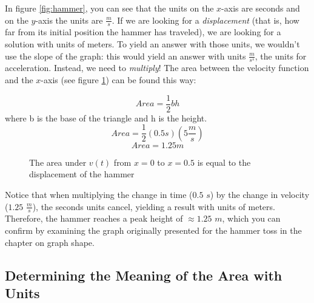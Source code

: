 In figure \ref{fig:hammer}, you can see that the units on the $x$-axis are seconds and on the $y$-axis the units are $\frac{m}{s}$. If we are looking for a \textit{displacement} (that is, how far from its initial position the hammer has traveled), we are looking for a solution with units of meters. To yield an answer with those units, we wouldn't use the slope of the graph: this would yield an answer with units $\frac{m}{s^s}$, the units for acceleration. Instead, we need to \textit{multiply}! The area between the velocity function and the $x$-axis (see figure \ref{fig:hammerarea}) can be found this way:

$$Area=\frac{1}{2}bh$$where b is the base of the triangle and h is the height. 
$$Area=\frac{1}{2}(0.5s)(5\frac{m}{s})$$
$$Area=1.25m$$


\begin{figure}[htbp]
	\centering
	\caption{The area under $v(t)$ from $x=0$ to $x=0.5$ is equal to the displacement of the hammer}
	\label{fig:hammerarea}
\end{figure}

Notice that when multiplying the change in time ($0.5$ $s$) by the change in velocity ($1.25$ $\frac{m}{s}$), the seconds units cancel, yielding a result with units of meters. Therefore, the hammer reaches a peak height of $\approx1.25$ $m$, which you can confirm by examining the graph originally presented for the hammer toss in the chapter on graph shape.

\subsection{Determining the Meaning of the Area with Units}

